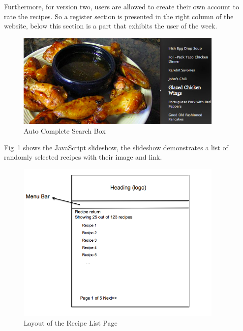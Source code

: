 Furthermore, for version two, users are allowed to create their own account to rate the recipes. So a register section is presented in the right column of the website, below this section is a part that exhibits the user of the week. 

\begin{figure}[H]
\begin{center}
\includegraphics[width=0.9\textwidth]{slideshow}
\caption{Auto Complete Search Box}
\label{fig:slideshow}
\end{center}
\end{figure}

Fig~\ref{fig:slideshow} shows the JavaScript slideshow, the slideshow demonstrates a list of randomly selected recipes with their image and link.  

\begin{figure}[H]
\begin{center}
\includegraphics[width=0.9\textwidth]{result_list_v2}
\caption{Layout of the Recipe List Page}
\label{fig:recipelistv2}
\end{center}
\end{figure}

